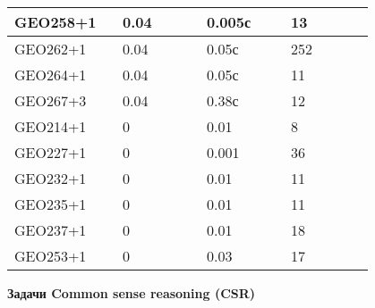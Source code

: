 \begin{longtable}[H]{|p{0.2\linewidth}|p{0.2\linewidth}|p{0.2\linewidth}|p{0.2\linewidth}|}
GEO258+1 &  0.04 &  0.005с &  13 \\
\hline
GEO262+1 &  0.04 &  0.05с &  252 \\
\hline
GEO264+1 &  0.04 &  0.05с &  11 \\
\hline
GEO267+3 &  0.04 &  0.38с &  12 \\
\hline
GEO214+1 &  0 &  0.01 &  8 \\
\hline
GEO227+1 &  0 &  0.001 &  36 \\
\hline
GEO232+1 &  0 &  0.01 &  11 \\
\hline
GEO235+1 &  0 &  0.01 &  11 \\
\hline
GEO237+1 &  0 &  0.01 &  18 \\
\hline
GEO253+1 &  0 &  0.03 &  17 \\
\hline
\end{longtable}





\textbf{Задачи Common sense reasoning (CSR)}

